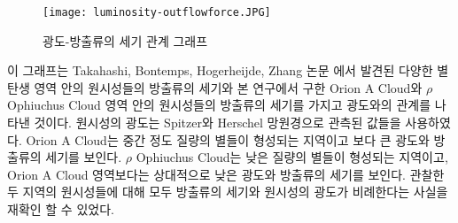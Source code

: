 \begin{figure}[h]
	\centering
	\texttt{[image: luminosity-outflowforce.JPG]}
	\caption{광도-방출류의 세기 관계 그래프}
\end{figure}

이 그래프는 Takahashi, Bontemps, Hogerheijde, Zhang 논문 에서 발견된 다양한 별 탄생 영역 안의 원시성들의 방출류의 세기와 본 연구에서 구한 Orion A Cloud와 $\rho$ Ophiuchus Cloud 영역 안의 원시성들의 방출류의 세기를 가지고 광도와의 관계를 나타낸 것이다.\cite{Takahashi} \cite{Bontemps} \cite{Hogerheijde} \cite{Zhang} 원시성의 광도는 Spitzer와 Herschel 망원경으로 관측된 값들을 사용하였다.\cite{OphDunham} \cite{Spitzer} \cite{HerschelFurlan} Orion A Cloud는 중간 정도 질량의 별들이 형성되는 지역이고 보다 큰 광도와 방출류의 세기를 보인다. $\rho$ Ophiuchus Cloud는 낮은 질량의 별들이 형성되는 지역이고, Orion A Cloud 영역보다는 상대적으로 낮은 광도와 방출류의 세기를 보인다. 관찰한 두 지역의 원시성들에 대해 모두 방출류의 세기와 원시성의 광도가 비례한다는 사실을 재확인 할 수 있었다.